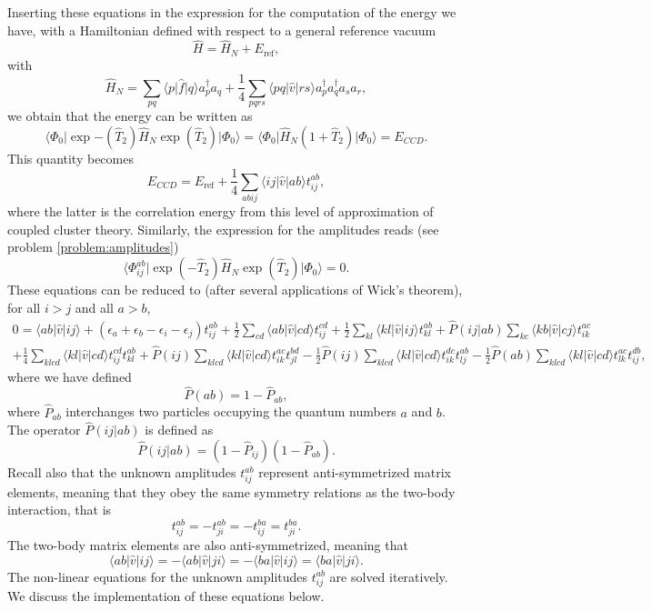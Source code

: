   Inserting these equations in the expression for the computation of
  the energy we have, with a Hamiltonian defined with respect to a
  general reference vacuum
  \[
  \hat{H}=\hat{H}_N+E_{\mathrm{ref}},
  \]
  with
  \[
  \hat{H}_N=\sum_{pq}\langle p \vert \hat{f} \vert q \rangle
  a^{\dagger}_pa_q + \frac{1}{4}\sum_{pqrs}\langle pq \vert \hat{v}
  \vert rs \rangle a^{\dagger}_pa^{\dagger}_qa_sa_r,
  \]
  we obtain that the energy can be written as
  \[
  \langle \Phi_0 \vert
  \exp{-\left(\hat{T}_2\right)}\hat{H}_N\exp{\left(\hat{T}_2\right)}\vert
  \Phi_0\rangle = \langle \Phi_0 \vert \hat{H}_N(1+\hat{T}_2)\vert
  \Phi_0\rangle = E_{CCD}.
  \]
  This quantity becomes
  \[
  E_{CCD}=E_{\mathrm{ref}}+\frac{1}{4}\sum_{abij}\langle ij \vert
  \hat{v} \vert ab \rangle t_{ij}^{ab},
  \]
  where the latter is the correlation energy from this level of
  approximation of coupled cluster  theory.  Similarly, the expression for the
  amplitudes reads (see problem \ref{problem:amplitudes})
  \[
  \langle \Phi_{ij}^{ab} \vert
  \exp{\left(-\hat{T}_2\right)}\hat{H}_N\exp{\left(\hat{T}_2\right)}\vert
  \Phi_0\rangle = 0.
  \]
  These equations can be reduced to (after several applications of
  Wick's theorem), for all $i > j$ and all $a > b$,
  \begin{align}
  0 = \langle ab \vert \hat{v} \vert ij \rangle +
  \left(\epsilon_a+\epsilon_b-\epsilon_i-\epsilon_j\right)t_{ij}^{ab}+\frac{1}{2}\sum_{cd} \langle ab \vert \hat{v} \vert
  cd \rangle t_{ij}^{cd}+\frac{1}{2}\sum_{kl} \langle kl \vert \hat{v}
  \vert ij \rangle t_{kl}^{ab}+\hat{P}(ij\vert ab)\sum_{kc} \langle kb
  \vert \hat{v} \vert cj \rangle t_{ik}^{ac} & \nonumber
  \\ +\frac{1}{4}\sum_{klcd} \langle kl \vert \hat{v} \vert cd \rangle
  t_{ij}^{cd}t_{kl}^{ab}+\hat{P}(ij)\sum_{klcd} \langle kl \vert
  \hat{v} \vert cd \rangle t_{ik}^{ac}t_{jl}^{bd}-\frac{1}{2}\hat{P}(ij)\sum_{klcd} \langle kl \vert \hat{v} \vert
  cd \rangle t_{ik}^{dc}t_{lj}^{ab}-\frac{1}{2}\hat{P}(ab)\sum_{klcd}
  \langle kl \vert \hat{v} \vert cd \rangle t_{lk}^{ac}t_{ij}^{db},&
  \label{eq:ccd}
  \end{align}
  where we have defined
  \[
  \hat{P}\left(ab\right)= 1-\hat{P}_{ab},
  \]
  where $\hat{P}_{ab}$ interchanges two particles occupying the
  quantum numbers $a$ and $b$.  The operator $\hat{P}(ij\vert ab)$ is
  defined as
  \[
  \hat{P}(ij\vert ab) = (1-\hat{P}_{ij})(1-\hat{P}_{ab}).
  \]
  Recall also that the unknown amplitudes $t_{ij}^{ab}$ represent
  anti-symmetrized matrix elements, meaning that they obey the same
  symmetry relations as the two-body interaction, that is
  \[
  t_{ij}^{ab}=-t_{ji}^{ab}=-t_{ij}^{ba}=t_{ji}^{ba}.
  \]
  The two-body matrix elements are also anti-symmetrized, meaning that
  \[
  \langle ab \vert \hat{v} \vert ij \rangle = -\langle ab \vert
  \hat{v} \vert ji \rangle= -\langle ba \vert \hat{v} \vert ij
  \rangle=\langle ba \vert \hat{v} \vert ji \rangle.
  \]
  The non-linear equations for the unknown amplitudes $t_{ij}^{ab}$
  are solved iteratively. We discuss the implementation of these
  equations below.

